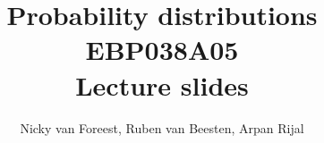 \usepackage{../common/preamble}


\setcounter{tocdepth}{1}
\usepackage{a4wide}
\usepackage{../common/abbreviations}


\title{Probability distributions EBP038A05\\
Lecture slides}

\author{Nicky van Foreest, Ruben van Beesten, Arpan Rijal}
